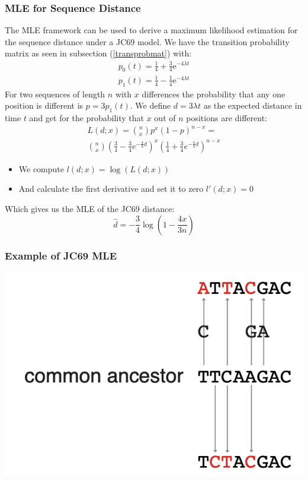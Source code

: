 \documentclass{article}
\begin{document}
\begin{multicols*}{3}
\subsubsection{MLE for Sequence Distance}
The MLE framework can be used to derive a maximum likelihood estimation for the sequence distance under a JC69 model. 
We have the transition probability matrix as seen in subsection (\ref{transprobmat}) with:
\begin{align*}
    p_0(t) = \frac{1}{4} + \frac{3}{4}\text{e}^{-4\lambda t}\\
    p_1(t) = \frac{1}{4} - \frac{1}{4}\text{e}^{-4\lambda t}
\end{align*}
For two sequences of length $n$ with $x$ differences the probability that any one position is different is $p = 3p_1(t)$. We define $d = 3\lambda t$ as the expected distance in time $t$ and get for the probability that $x$ out of $n$ positions are different: \begin{align*}
L(d;x) = {n \choose x} p^{x}(1-p)^{n-x}=\\
{n \choose x}
\left(\frac{3}{4}-\frac{3}{4} e^{-\frac{4}{3} d}\right)^{x}\left(\frac{1}{4}+\frac{3}{4} e^{-\frac{4}{3} d}\right)^{n-x}
\end{align*}
\begin{itemize}
    \item We compute $l(d;x) = \log(L(d;x))$
    \item And calculate the first derivative and set it to zero $l'(d;x) = 0$
\end{itemize}

Which gives us the MLE of the JC69 distance: 
$$\hat{d} = -\frac{3}{4}\log\left(1-\frac{4x}{3n}\right)$$

\subsubsection{Example of JC69 MLE}

\begin{center}
    \includegraphics[width=0.5\linewidth]{mlejc69.png}
\end{center}


\end{multicols*}
\end{document}
